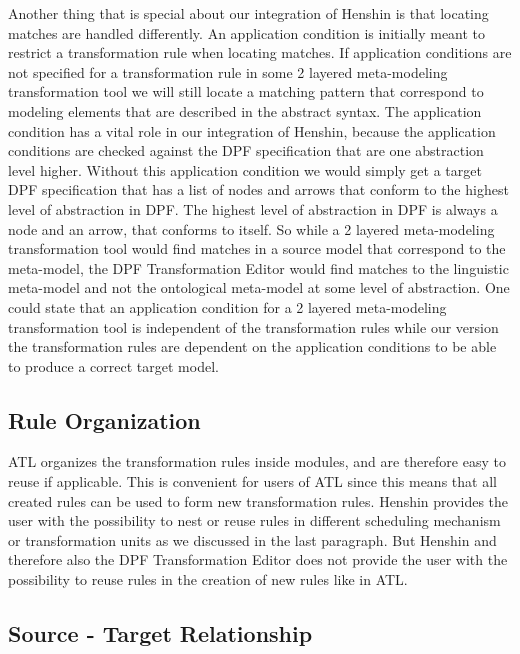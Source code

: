 Another thing that is special about our integration of Henshin is that locating
matches are handled differently. An application condition is initially meant to
restrict a transformation rule when locating matches. If application conditions
are not specified for a transformation rule in some 2 layered meta-modeling
transformation tool we will still locate a matching pattern that correspond to
modeling elements that are described in the abstract syntax. The application
condition has a vital role in our integration of Henshin, because the
application conditions are checked against the DPF specification that are one
abstraction level higher. Without this application condition we would simply get
a target DPF specification that has a list of nodes and arrows that conform to
the highest level of abstraction in DPF. The highest level of abstraction in DPF
is always a node and an arrow, that conforms to itself. So while a 2 layered
meta-modeling transformation tool would find matches in a source model that
correspond to the meta-model, the DPF Transformation Editor would find matches to
the linguistic meta-model and not the ontological meta-model at some level of
abstraction. One could state that an application condition for a 2 layered
meta-modeling transformation tool is independent of the transformation rules
while our version the transformation rules are dependent on the application
conditions to be able to produce a correct target model. 

\subsection{Rule Organization}

ATL organizes the transformation rules inside modules, and are therefore easy to
reuse if applicable. This is convenient for
users of ATL since this means that all created rules can be used to form new
transformation rules. Henshin provides the user with the possibility to nest or 
reuse rules in different scheduling mechanism or transformation units
as we discussed in the last paragraph. But Henshin and therefore also the DPF
Transformation Editor does not provide the user with the possibility to
reuse rules in the creation of new rules like in ATL. 

\subsection{Source - Target Relationship}

